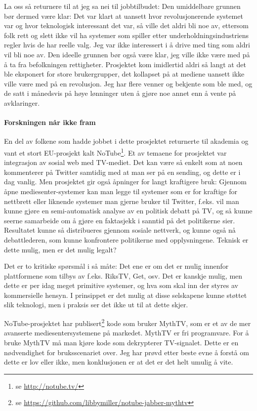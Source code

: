\documentclass[11pt,norsk,a4paper]{article}
\begin{document}
La oss så returnere til at jeg sa nei til jobbtilbudet: Den
umiddelbare grunnen bør dermed være klar: Det var klart at uansett
hvor revolusjonerende systemet var og hvor teknologisk interessant det
var, så ville det aldri bli noe av, ettersom folk rett og slett ikke
vil ha systemer som spiller etter underholdningsindustriens regler
hvis de har reelle valg. Jeg var ikke interessert i å drive med ting
som aldri vil bli noe av. Den ideelle grunnen bør også være klar, jeg
ville ikke være med på å ta fra befolkningen rettigheter. Prosjektet
kom imidlertid aldri så langt at det ble eksponert for store
brukergrupper, det kollapset på at mediene uansett ikke ville være med
på en revolusjon. Jeg har flere venner og bekjente som ble med, og de
satt i månedsvis på høye lønninger uten å gjøre noe annet enn å vente
på avklaringer.

\paragraph{Forskningen når ikke fram}

En del av folkene som hadde jobbet i dette prosjektet returnerte til
akademia og vant et stort EU-prosjekt kalt
NoTube\footnote{se \url{http://notube.tv/}}. Et av temaene for
prosjektet var integrasjon av sosial web med TV-mediet. Det kan være
så enkelt som at noen kommenterer på Twitter samtidig med at man ser
på en sending, og dette er i dag vanlig. Men prosjektet gir også
åpninger for langt kraftigere bruk: Gjennom åpne mediesenter-systemer
kan man legge til systemer som er for kraftige for nettbrett eller
liknende systemer man gjerne bruker til Twitter, f.eks. vil man kunne
gjøre en semi-automatisk analyse av en politisk debatt på TV, og så
kunne seerne samarbeide om å gjøre en faktasjekk i sanntid på det
politikerne sier. Resultatet kunne så distribueres gjennom sosiale
nettverk, og kunne også nå debattlederen, som kunne konfrontere
politikerne med opplysningene. Teknisk er dette mulig, men er det
mulig legalt?

Det er to kritiske spørsmål i så måte: Det ene er om det er mulig
innenfor plattformene som tilbys av f.eks. RiksTV, Get, osv. Det er
kanskje mulig, men dette er per idag meget primitive systemer, og hva
som skal inn der styres av kommersielle hensyn. I prinsippet er det
mulig at disse selskapene kunne støttet slik teknologi, men i praksis
ser det ikke ut til at dette skjer.

NoTube-prosjektet har
publisert\footnote{se \url{https://github.com/libbymiller/notube-jabber-mythtv}}
kode som bruker MythTV, som er et av de mer avanserte
mediesentersystemene på markedet. MythTV er fri programvare. For å
bruke MythTV må man kjøre kode som dekrypterer TV-signalet. Dette er
en nødvendighet for bruksscenariet over. Jeg har prøvd etter beste
evne å forstå om dette er lov eller ikke, men konklusjonen er at det
er det helt umulig å vite. 
\end{document}
